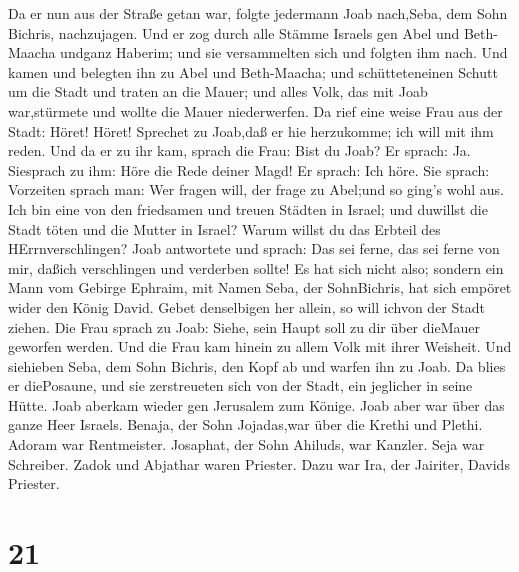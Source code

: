  Da er nun aus der Straße getan war, folgte jedermann Joab
nach,Seba, dem Sohn Bichris, nachzujagen.  Und er zog durch
alle Stämme Israels gen Abel und Beth-Maacha undganz Haberim; und sie
versammelten sich und folgten ihm nach.  Und kamen und
belegten ihn zu Abel und Beth-Maacha; und schütteteneinen Schutt um die
Stadt und traten an die Mauer; und alles Volk, das mit Joab war,stürmete
und wollte die Mauer niederwerfen.  Da rief eine weise Frau
aus der Stadt: Höret! Höret! Sprechet zu Joab,daß er hie herzukomme; ich
will mit ihm reden.  Und da er zu ihr kam, sprach die Frau:
Bist du Joab? Er sprach: Ja. Siesprach zu ihm: Höre die Rede deiner
Magd! Er sprach: Ich höre.  Sie sprach: Vorzeiten sprach
man: Wer fragen will, der frage zu Abel;und so ging's wohl aus.
 Ich bin eine von den friedsamen und treuen Städten in
Israel; und duwillst die Stadt töten und die Mutter in Israel? Warum
willst du das Erbteil des HErrnverschlingen?  Joab
antwortete und sprach: Das sei ferne, das sei ferne von mir, daßich
verschlingen und verderben sollte! Es hat sich nicht also; 
sondern ein Mann vom Gebirge Ephraim, mit Namen Seba, der SohnBichris,
hat sich empöret wider den König David. Gebet denselbigen her allein, so
will ichvon der Stadt ziehen. Die Frau sprach zu Joab: Siehe, sein Haupt
soll zu dir über dieMauer geworfen werden.  Und die Frau
kam hinein zu allem Volk mit ihrer Weisheit. Und siehieben Seba, dem
Sohn Bichris, den Kopf ab und warfen ihn zu Joab. Da blies er
diePosaune, und sie zerstreueten sich von der Stadt, ein jeglicher in
seine Hütte. Joab aberkam wieder gen Jerusalem zum Könige. 
Joab aber war über das ganze Heer Israels. Benaja, der Sohn Jojadas,war
über die Krethi und Plethi.  Adoram war Rentmeister.
Josaphat, der Sohn Ahiluds, war Kanzler.  Seja war
Schreiber. Zadok und Abjathar waren Priester.  Dazu war
Ira, der Jairiter, Davids Priester.

\hypertarget{section-20}{%
\section{21}\label{section-20}}

